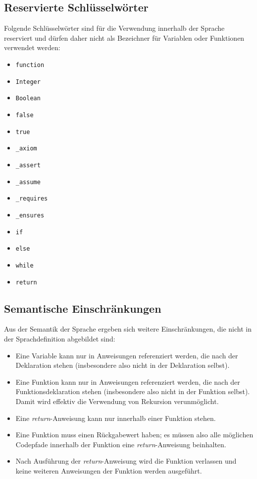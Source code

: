 \subsection{Reservierte Schlüsselwörter}

Folgende Schlüsselwörter sind für die Verwendung innerhalb der Sprache reserviert und dürfen daher nicht als Bezeichner für Variablen oder Funktionen verwendet werden:

\begin{itemize}
	\item \texttt{function}
	\item \texttt{Integer}
	\item \texttt{Boolean}
	\item \texttt{false}
	\item \texttt{true}	
	\item \texttt{\_axiom}
	\item \texttt{\_assert}
	\item \texttt{\_assume}
	\item \texttt{\_requires}
	\item \texttt{\_ensures}
	\item \texttt{if}
	\item \texttt{else}	
	\item \texttt{while}		
	\item \texttt{return}	
\end{itemize}

\subsection{Semantische Einschränkungen}
Aus der Semantik der Sprache ergeben sich weitere Einschränkungen, die nicht in der Sprachdefinition abgebildet sind:

\begin{itemize}
	\item Eine Variable kann nur in Anweisungen referenziert werden, die nach der Deklaration stehen (insbesondere also nicht in der Deklaration selbst).
	\item Eine Funktion kann nur in Anweisungen referenziert werden, die nach der Funktionsdeklaration stehen (insbesondere also nicht in der Funktion selbst). Damit wird effektiv die Verwendung von Rekursion verunmöglicht.
	\item Eine \textit{return}-Anweisung kann nur innerhalb einer Funktion stehen.
	\item Eine Funktion muss einen Rückgabewert haben; es müssen also alle möglichen Codepfade innerhalb der Funktion eine \textit{return}-Anweisung beinhalten.
	\item Nach Ausführung der \textit{return}-Anweisung wird die Funktion verlassen und keine weiteren Anweisungen der Funktion werden ausgeführt.
\end{itemize}

